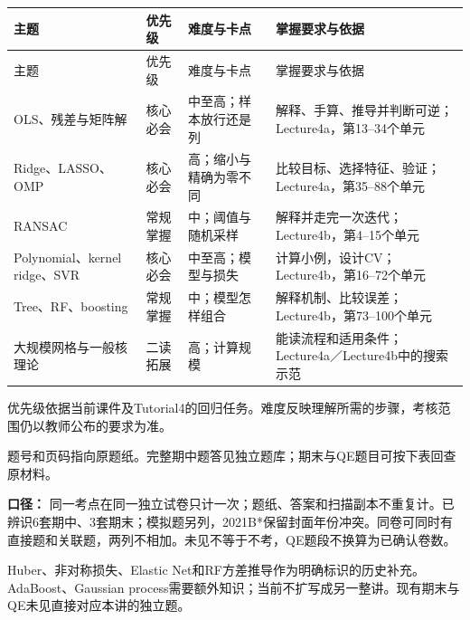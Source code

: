 \begingroup
\small\setlength{\tabcolsep}{3pt}
\renewcommand{\arraystretch}{1.22}
\begin{longtable}{@{}>{\raggedright\arraybackslash}p{}>{\raggedright\arraybackslash}p{}>{\raggedright\arraybackslash}p{}>{\raggedright\arraybackslash}p{}@{}}
\toprule
主题 & 优先级 & 难度与卡点 & 掌握要求与依据 \\
\midrule\endfirsthead
主题 & 优先级 & 难度与卡点 & 掌握要求与依据 \\
\midrule\endhead
\bottomrule\endfoot
OLS、残差与矩阵解 & 核心必会 & 中至高；样本放行还是列 & 解释、手算、推导并判断可逆；Lecture4a，第13–34个单元 \\
Ridge、LASSO、OMP & 核心必会 & 高；缩小与精确为零不同 & 比较目标、选择特征、验证；Lecture4a，第35–88个单元 \\
RANSAC & 常规掌握 & 中；阈值与随机采样 & 解释并走完一次迭代；Lecture4b，第4–15个单元 \\
Polynomial、kernel ridge、SVR & 核心必会 & 中至高；模型与损失 & 计算小例，设计CV；Lecture4b，第16–72个单元 \\
Tree、RF、boosting & 常规掌握 & 中；模型怎样组合 & 解释机制、比较误差；Lecture4b，第73–100个单元 \\
大规模网格与一般核理论 & 二读拓展 & 高；计算规模 & 能读流程和适用条件；Lecture4a／Lecture4b中的搜索示范 \\
\end{longtable}
\endgroup

优先级依据当前课件及Tutorial4的回归任务。难度反映理解所需的步骤，考核范围仍以教师公布的要求为准。



题号和页码指向原题纸。完整期中题答见独立题库；期末与QE题目可按下表回查原材料。




\textbf{口径：} 同一考点在同一独立试卷只计一次；题纸、答案和扫描副本不重复计。已辨识6套期中、3套期末；模拟题另列，2021B*保留封面年份冲突。同卷可同时有直接题和关联题，两列不相加。未见不等于不考，QE题段不换算为已确认卷数。


Huber、非对称损失、Elastic Net和RF方差推导作为明确标识的历史补充。AdaBoost、Gaussian process需要额外知识；当前不扩写成另一整讲。现有期末与QE未见直接对应本讲的独立题。



